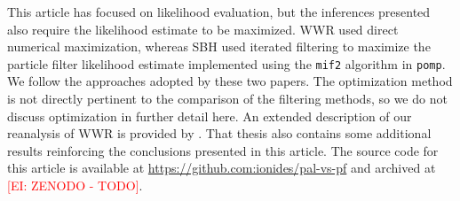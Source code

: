 \documentclass[10pt]{article}\usepackage[]{graphicx}\usepackage[]{xcolor}
\newcommand{\ed}[1]{\textcolor{red}{[EI: #1]}}
\begin{document}
This article has focused on likelihood evaluation, but the inferences presented also require the likelihood estimate to be maximized.
WWR used direct numerical maximization, whereas SBH used iterated filtering to maximize the particle filter likelihood estimate implemented using the \texttt{mif2} algorithm in \texttt{pomp}.
We follow the approaches adopted by these two papers.
The optimization method is not directly pertinent to the comparison of the filtering methods, so we do not discuss optimization in further detail here.
An extended description of our reanalysis of WWR is provided by \cite{hao24}.
That thesis also contains some additional results reinforcing the conclusions presented in this article.
The source code for this article is available at \url{https://github.com:ionides/pal-vs-pf} and archived at \ed{ZENODO - TODO}.


\end{document}
